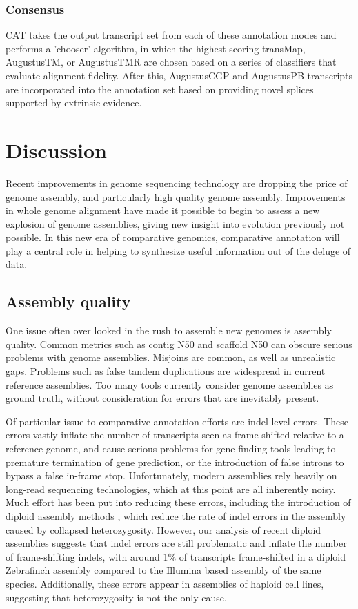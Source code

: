 \documentclass[fleqn,10pt]{wlscirep}
\begin{document}
\subsubsection{Consensus}

CAT takes the output transcript set from each of these annotation modes and performs a 'chooser' algorithm, in which the highest scoring transMap, AugustusTM, or AugustusTMR are chosen based on a series of classifiers that evaluate alignment fidelity. After this, AugustusCGP and AugustusPB transcripts are incorporated into the annotation set based on providing novel splices supported by extrinsic evidence.

\section{Discussion}
Recent improvements in genome sequencing technology are dropping the price of genome assembly, and particularly high quality genome assembly. Improvements in whole genome alignment have made it possible to begin to assess a new explosion of genome assemblies, giving new insight into evolution previously not possible. In this new era of comparative genomics, comparative annotation will play a central role in helping to synthesize useful information out of the deluge of data.

\subsection{Assembly quality}
One issue often over looked in the rush to assemble new genomes is assembly quality. Common metrics such as contig N50 and scaffold N50 can obscure serious problems with genome assemblies. Misjoins are common, as well as unrealistic gaps. Problems such as false tandem duplications are widespread in current reference assemblies. Too many tools currently consider genome assemblies as ground truth, without consideration for errors that are inevitably present.

Of particular issue to comparative annotation efforts are indel level errors. These errors vastly inflate the number of transcripts seen as frame-shifted relative to a reference genome, and cause serious problems for gene finding tools leading to premature termination of gene prediction, or the introduction of false introns to bypass a false in-frame stop. Unfortunately, modern assemblies rely heavily on long-read sequencing technologies, which at this point are all inherently noisy. Much effort has been put into reducing these errors, including the introduction of diploid assembly methods \cite{chin2016phased}, which reduce the rate of indel errors in the assembly caused by collapsed heterozygosity. However, our analysis of recent diploid assemblies suggests that indel errors are still problematic and inflate the number of frame-shifting indels, with around 1\% of transcripts frame-shifted in a diploid Zebrafinch assembly compared to the Illumina based assembly of the same species. Additionally, these errors appear in assemblies of haploid cell lines, suggesting that heterozygosity is not the only cause.
\end{document}
